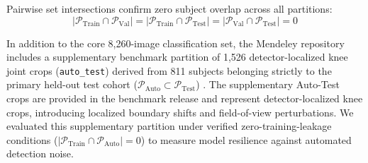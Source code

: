 \documentclass[10pt,journal]{IEEEtran}
\begin{document}
Pairwise set intersections confirm zero subject overlap across all partitions:
\begin{equation}
|\mathcal{P}_{\text{Train}} \cap \mathcal{P}_{\text{Val}}| = |\mathcal{P}_{\text{Train}} \cap \mathcal{P}_{\text{Test}}| = |\mathcal{P}_{\text{Val}} \cap \mathcal{P}_{\text{Test}}| = 0
\label{eq:leakage_free}
\end{equation}

In addition to the core 8,260-image classification set, the Mendeley repository includes a supplementary benchmark partition of 1,526 detector-localized knee joint crops (\texttt{auto\_test}) derived from 811 subjects belonging strictly to the primary held-out test cohort ($\mathcal{P}_{\text{Auto}} \subset \mathcal{P}_{\text{Test}}$) \cite{chen2018dataset, chen2019fully}. The supplementary Auto-Test crops are provided in the benchmark release and represent detector-localized knee crops, introducing localized boundary shifts and field-of-view perturbations. We evaluated this supplementary partition under verified zero-training-leakage conditions ($|\mathcal{P}_{\text{Train}} \cap \mathcal{P}_{\text{Auto}}| = 0$) to measure model resilience against automated detection noise.
\end{document}

